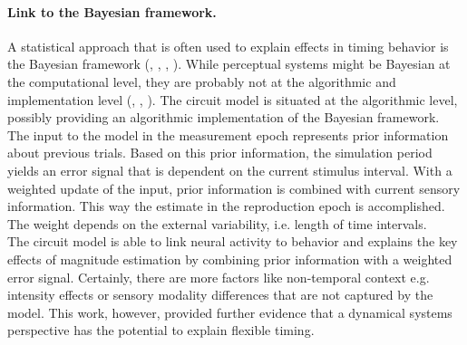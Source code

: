 \documentclass[10pt]{article}
\begin{document}
\paragraph{Link to the Bayesian framework.}
A statistical approach that is often used to explain effects in timing behavior is the Bayesian framework (\cite{Petzschner2012}, \cite{Shi2013}, \cite{Petzschner2015}, \cite{Sohn2019}).
While perceptual systems might be Bayesian at the computational level, they are probably not at the algorithmic and implementation level (\cite{marr1976}, \cite{Block2018}, \cite{Kwisthout2020}).
The circuit model is situated at the algorithmic level, possibly providing an algorithmic implementation of the Bayesian framework. %
The input to the model in the measurement epoch represents prior information about previous trials. Based on this prior information, the simulation period yields an error signal that is dependent on the current stimulus interval. With a weighted update of the input, prior information is combined with current sensory information. This way the estimate in the reproduction epoch is accomplished. The weight depends on the external variability, i.e. length of time intervals. \\

\noindent The circuit model is able to link neural activity to behavior and explains the key effects of magnitude estimation by combining prior information with a weighted error signal. 
Certainly, there are more factors like non-temporal context e.g. intensity effects or sensory modality differences that are not captured by the model.
This work, however, provided further evidence that a dynamical systems perspective has the potential to explain flexible timing.


\end{document}

